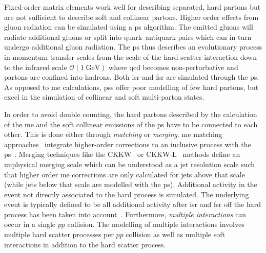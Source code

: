 Fixed-order matrix elements work well for describing separated, hard partons but are not sufficient to describe soft and collinear partons. Higher order effects from gluon radiation can be simulated using a \gls{ps} algorithm. The emitted gluons will radiate additional gluons or split into quark--antiquark pairs which can in turn undergo additional gluon radiation. The \gls{ps}  thus describes an evolutionary process in momentum transfer scales from the scale of the hard scatter interaction down to the infrared scale $\mathcal{O}(\SI{1}{\GeV})$ where \gls{qcd} becomes non-perturbative and partons are confined into hadrons. Both \gls{isr} and \gls{fsr} are simulated through the \gls{ps}. As opposed to \gls{me} calculations, \glspl{ps} offer poor modelling of few hard partons, but excel in the simulation of collinear and soft multi-parton states.

In order to avoid double counting, the hard partons described by the calculation of the \gls{me} and the soft collinear emissions of the \gls{ps} have to be connected to each other. This is done either through \textit{matching} or \textit{merging}. \gls{me} matching approaches~\cite{Bengtsson:1986hr} integrate higher-order corrections to an inclusive process with the \gls{ps}~\cite{Buckley:2011ms}. Merging techniques like the CKKW~\cite{Catani:2001cc} or CKKW-L~\cite{Lonnblad:2001iq} methods define an unphysical merging scale which can be understood as a jet resolution scale such that higher order \gls{me} corrections are only calculated for jets above that scale (while jets below that scale are modelled with the \gls{ps}).
Additional activity in the event not directly associated to the hard process is simulated. The underlying event is typically defined to be all additional activity after \gls{isr} and \gls{fsr} off the hard process has been taken into account~\cite{Buckley:2011ms}. Furthermore, \textit{multiple interactions} can occur in a single $pp$ collision. The modelling of multiple interactions involves multiple hard scatter processes per $pp$ collision as well as multiple soft interactions in addition to the hard scatter process.

